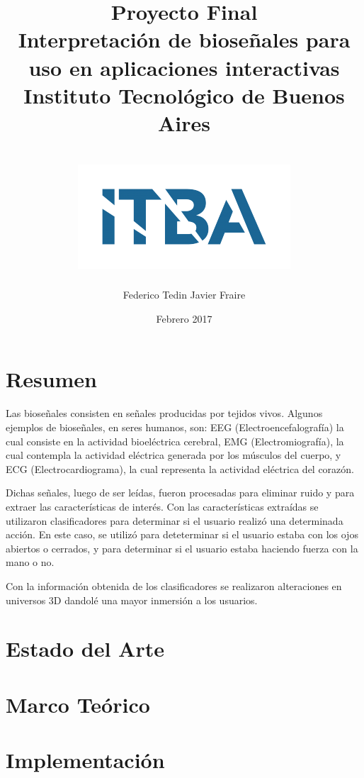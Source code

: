 \documentclass[a4paper]{report}
\title{
	{\Huge Proyecto Final}\\
	{\Huge Interpretación de bioseñales para uso en aplicaciones interactivas}
	{\large Instituto Tecnológico de Buenos Aires}\\~\\
	{\includegraphics{itba.png}}
}
\author{{Federico Tedin} {Javier Fraire}}
\date{Febrero 2017}
\begin{document}
\maketitle

\chapter*{Resumen}
\justifying
Las bioseñales consisten en señales producidas por tejidos vivos. Algunos ejemplos de bioseñales, en seres humanos, son: EEG (Electroencefalografía) la cual consiste en la actividad bioeléctrica cerebral, EMG (Electromiografía), la cual contempla la actividad eléctrica generada por los músculos del cuerpo, y ECG (Electrocardiograma), la cual representa la actividad eléctrica del corazón.

Dichas señales, luego de ser leídas, fueron procesadas para eliminar ruido y para extraer las características de interés. Con las características extraídas se utilizaron clasificadores para determinar si el usuario realizó una determinada acción. En este caso, se utilizó para deteterminar si el usuario estaba con los ojos abiertos o cerrados, y para determinar si el usuario estaba haciendo fuerza con la mano o no.

Con la información obtenida de los clasificadores se realizaron alteraciones en universos 3D dandolé una mayor inmersión a los usuarios.


\tableofcontents

\chapter{Estado del Arte}


\chapter{Marco Teórico}


\chapter{Implementación}


{}

 
\end{document}
